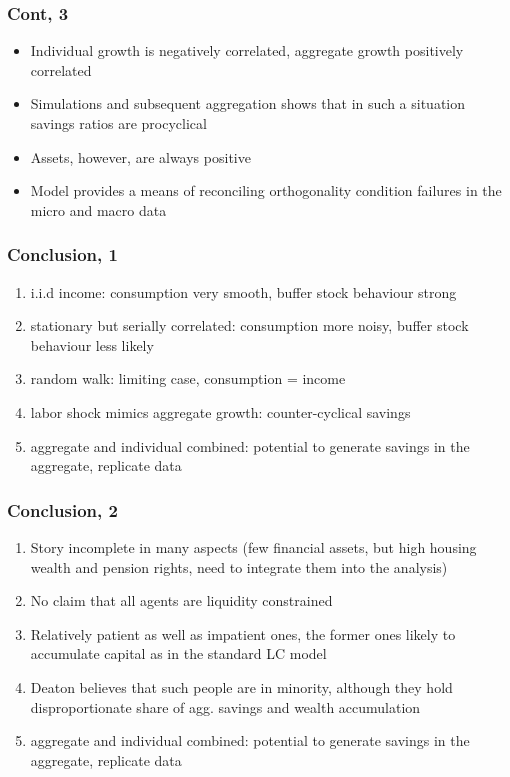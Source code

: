 \documentclass[mathserif]{beamer}
\begin{document}
\begin{frame}
\frametitle{Cont, 3}
\begin{itemize}
  \item Individual growth is negatively correlated, aggregate growth positively correlated
  \item Simulations and subsequent aggregation shows that in such a situation savings ratios are procyclical
  \item Assets, however, are always positive
  \item Model provides a means of reconciling orthogonality condition failures in the micro and macro data
\end{itemize}

\end{frame}

\begin{frame}
\frametitle{Conclusion, 1}
\begin{enumerate}
  \item i.i.d income: consumption very smooth, buffer stock behaviour strong
  \item stationary but serially correlated: consumption more noisy, buffer stock behaviour less likely
  \item random walk: limiting case, consumption = income
  \item labor shock mimics aggregate growth: counter-cyclical savings
  \item aggregate and individual combined: potential to generate savings in the aggregate, replicate data
\end{enumerate}
\end{frame}

\begin{frame}
\frametitle{Conclusion, 2}
\begin{enumerate}
  \item Story incomplete in many aspects (few financial assets, but high housing wealth and pension rights, need to integrate them into the analysis)
  \item No claim that all agents are liquidity constrained
  \item Relatively patient as well as impatient ones, the former ones likely to accumulate capital as in the standard LC model
  \item Deaton believes that such people are in minority, although they hold disproportionate share of agg. savings and wealth accumulation
  \item aggregate and individual combined: potential to generate savings in the aggregate, replicate data
\end{enumerate}
\end{frame}
\end{document}

